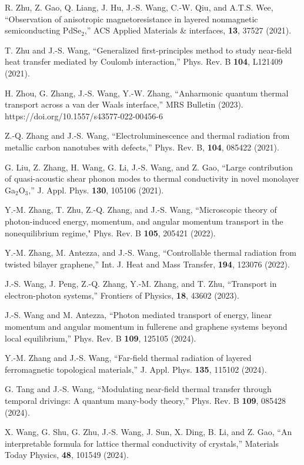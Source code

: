 \itm R. Zhu, Z. Gao, Q. Liang, J. Hu, J.-S. Wang, C.-W. Qiu, and A.T.S. Wee,
 ``Observation of anisotropic magnetoresistance in layered nonmagnetic semiconducting PdSe$_2$,'' 
 ACS Applied Materials \& interfaces, {\bf 13}, 37527 (2021). 

\itm T. Zhu and J.-S. Wang, ``Generalized first-principles method to study near-field heat transfer mediated by Coulomb interaction,'' 
Phys. Rev. B {\bf 104}, L121409 (2021).

\itm H. Zhou, G. Zhang, J.-S. Wang, Y.-W. Zhang, 
``Anharmonic quantum thermal transport across a van der Waals interface,'' MRS Bulletin (2023).   https://doi.org/10.1557/s43577-022-00456-6

\itm Z.-Q. Zhang and J.-S. Wang, ``Electroluminescence and thermal radiation from metallic carbon nanotubes with defects,'' Phys. Rev. B, 
{\bf 104}, 085422 (2021). 
 
\itm G. Liu, Z. Zhang, H. Wang, G. Li, J.-S. Wang, and Z. Gao, 
``Large contribution of quasi-acoustic shear phonon modes to thermal conductivity in novel monolayer Ga$_2$O$_3$,''
 J. Appl. Phys. {\bf 130}, 105106 (2021).  

\itm  Y.-M. Zhang, T. Zhu, Z.-Q. Zhang, and J.-S. Wang, 
``Microscopic theory of photon-induced energy, momentum, and angular momentum transport in the nonequilibrium regime," 
Phys. Rev. B {\bf 105}, 205421 (2022).

\itm Y.-M. Zhang, M. Antezza, and J.-S. Wang, ``Controllable thermal radiation from twisted bilayer graphene,'' 
Int. J. Heat and Mass Transfer, {\bf 194}, 123076 (2022). 

\itm J.-S. Wang, J. Peng, Z.-Q. Zhang, Y.-M. Zhang, and T. Zhu, ``Transport in electron-photon systems,''
Frontiers of Physics, {\bf 18}, 43602 (2023).

\itm J.-S. Wang and M. Antezza, ``Photon mediated transport of energy, linear momentum and angular momentum in fullerene and 
graphene systems beyond local equilibrium,'' Phys. Rev. B {\bf 109}, 125105 (2024).

\itm Y.-M. Zhang and J.-S. Wang, ``Far-field thermal radiation of layered ferromagnetic topological materials,'' 
J. Appl. Phys. {\bf 135}, 115102 (2024).

\itm G. Tang and J.-S. Wang, ``Modulating near-field thermal transfer through temporal drivings: A quantum many-body theory,'' 
Phys. Rev. B {\bf 109}, 085428 (2024).

\itm X. Wang, G. Shu, G. Zhu, J.-S. Wang, J. Sun, X. Ding, B. Li, and Z. Gao, ``An interpretable formula for lattice thermal conductivity of crystals,'' Materials Today Physics, {\bf 48}, 101549 (2024).

